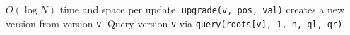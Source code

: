 
$O(\log N)$ time and space per update. \lstinline|upgrade(v, pos, val)| creates a new version from version \lstinline|v|. Query version \lstinline|v| via \lstinline|query(roots[v], 1, n, ql, qr)|.


